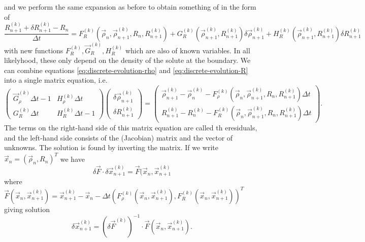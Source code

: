 \documentclass[12pt,twoside]{report}
\begin{document}
and we perform the same expansion as before to obtain something of in the form of
\begin{equation}\label{eq:discrete-evolution-R}
  \frac{R_{n+1}^{(k)} + \delta R_{n+1}^{(k)} - R_n}{\Delta t}
  =
  F_R^{(k)} (\vec{\rho}_n, \vec{\rho}_{n+1}^{(k)}, R_n, R_{n+1}^{(k)}) +
  G_R^{(k)} (\vec{\rho}_{n+1}^{(k)}, R_{n+1}^{(k)}) \delta \vec{\rho}_{n+1}^{(k)} +
  H_R^{(k)} (\vec{\rho}_{n+1}^{(k)}, R_{n+1}^{(k)}) \delta R_{n+1}^{(k)}
\end{equation}
with new functions $F_R^{(k)},\vec{G}_R^{(k)},H_R^{(k)}$ which are also of known variables.
In all likelyhood, these only depend on the density of the solute at the boundary.
We can combine equations \eqref{eq:discrete-evolution-rho} and \eqref{eq:discrete-evolution-R} into a single matrix equation, i.e.
\begin{equation}
  \begin{pmatrix}
    \vec{G}_\rho^{(k)} \Delta t - 1 & H_\rho^{(k)} \Delta t \\
    G_R^{(k)} \Delta t & H_R^{(k)} \Delta t - 1
  \end{pmatrix}
  \begin{pmatrix}
    \delta \vec{\rho}_{n+1}^{(k)} \\
    \delta R_{n+1}^{(k)}
  \end{pmatrix}
  =
  \begin{pmatrix}
    \vec{\rho}_{n+1}^{(k)} - \vec{\rho}_n^{(k)} -
    F_\rho^{(k)} (\vec{\rho}_n, \vec{\rho}_{n+1}^{(k)}, R_n, R_{n+1}^{(k)})
    \Delta t
    \\
    R_{n+1}^{(k)} - R_n^{(k)} -
    F_R^{(k)} (\vec{\rho}_n, \vec{\rho}_{n+1}^{(k)}, R_n, R_{n+1}^{(k)})
    \Delta t
  \end{pmatrix}.
\end{equation}
The terms on the right-hand side of this matrix equation are called th eresiduals, and the left-hand side consists of the (Jacobian) matrix and the vector of unknowns.
The solution is found by inverting the matrix.
If we write $\vec{x}_n = (\vec{\rho}_n, R_n)^T$ we have
\begin{equation}
  \delta \vec{F} \cdot \delta \vec{x}_{n+1}^{(k)} =
  \vec{F}(\vec{x}_n, \vec{x}_{n+1}^{(k)}
\end{equation}
where $\vec{F}(\vec{x}_n, \vec{x}_{n+1}^{(k)}) = \vec{x}_{n+1}^{(k)} - \vec{x}_n - \Delta t (F_\rho^{(k)} (\vec{x}_n, \vec{x}_{n+1}^{(k)}), F_R^{(k)} (\vec{x}_n, \vec{x}_{n+1}^{(k)}))^T$ giving solution
\begin{equation}
  \delta \vec{x}_{n+1}^{(k)} =
  (\delta \vec{F}^{(k)})^{-1} \cdot \vec{F}(\vec{x}_n, \vec{x}_{n+1}^{(k)}).
\end{equation}
\end{document}
